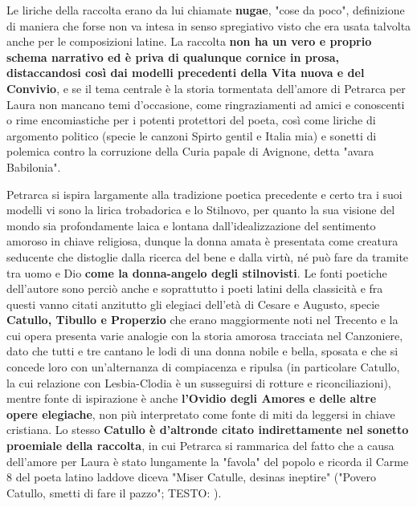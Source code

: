 \documentclass[10pt,a4paper]{article}
\begin{document}
Le liriche della raccolta erano da lui chiamate \textbf{nugae}, "cose da poco", definizione di maniera che forse non va intesa in senso spregiativo visto che era usata talvolta anche per le composizioni latine. La raccolta \textbf{non ha un vero e proprio schema narrativo ed è priva di qualunque cornice in prosa, distaccandosi così dai modelli precedenti della Vita nuova e del Convivio}, e se il tema centrale è la storia tormentata dell'amore di Petrarca per Laura non mancano temi d'occasione, come ringraziamenti ad amici e conoscenti o rime encomiastiche per i potenti protettori del poeta, così come liriche di argomento politico (specie le canzoni Spirto gentil e Italia mia) e sonetti di polemica contro la corruzione della Curia papale di Avignone, detta "avara Babilonia".

Petrarca si ispira largamente alla tradizione poetica precedente e certo tra i suoi modelli vi sono la lirica trobadorica e lo Stilnovo, per quanto la sua visione del mondo sia profondamente laica e lontana dall'idealizzazione del sentimento amoroso in chiave religiosa, dunque la donna amata è presentata come creatura seducente che distoglie dalla ricerca del bene e dalla virtù, né può fare da tramite tra uomo e Dio \textbf{come la donna-angelo degli stilnovisti}. Le fonti poetiche dell'autore sono perciò anche e soprattutto i poeti latini della classicità e fra questi vanno citati anzitutto gli elegiaci dell'età di Cesare e Augusto, specie \textbf{Catullo, Tibullo e Properzio} che erano maggiormente noti nel Trecento e la cui opera presenta varie analogie con la storia amorosa tracciata nel Canzoniere, dato che tutti e tre cantano le lodi di una donna nobile e bella, sposata e che si concede loro con un'alternanza di compiacenza e ripulsa (in particolare Catullo, la cui relazione con Lesbia-Clodia è un susseguirsi di rotture e riconciliazioni), mentre fonte di ispirazione è anche \textbf{l'Ovidio degli Amores e delle altre opere elegiache}, non più interpretato come fonte di miti da leggersi in chiave cristiana. Lo stesso \textbf{Catullo è d'altronde citato indirettamente nel sonetto proemiale della raccolta}, in cui Petrarca si rammarica del fatto che a causa dell'amore per Laura è stato lungamente la "favola" del popolo e ricorda il Carme 8 del poeta latino laddove diceva "Miser Catulle, desinas ineptire" ("Povero Catullo, smetti di fare il pazzo"; TESTO: ).
\end{document}
